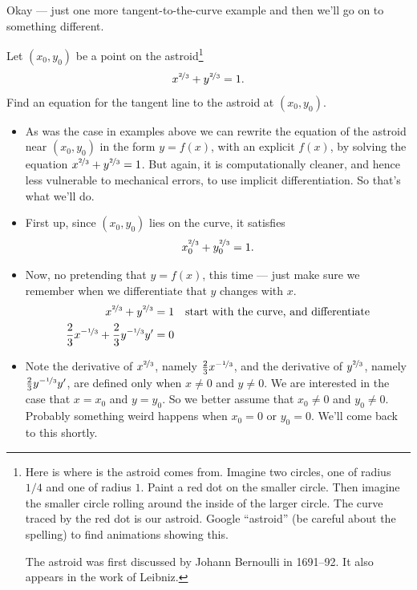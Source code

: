 Okay --- just one more tangent-to-the-curve example and then we'll go on to
something different.
\begin{eg}\label{eg:DIFFimpldiffB}
Let $(x_0,y_0)$ be a point on the astroid\footnote{Here is where is the
astroid comes from. Imagine two circles, one of radius $1/4$ and
one of radius $1$. Paint a red dot on the smaller circle. Then imagine
the smaller circle rolling around the inside of the larger circle. The
curve traced by the red dot is our astroid. Google ``astroid'' (be careful
about the spelling) to find animations showing this.

The astroid was first discussed by Johann Bernoulli in 1691--92. It also
appears in the work of Leibniz.}
\begin{align*}
x^{\nicefrac{2}{3}}+y^{\nicefrac{2}{3}}=1.
\end{align*}
Find an equation for the tangent line to the astroid at $(x_0,y_0)$.

\begin{itemize}
 \item As was the case in examples above we can rewrite the equation of
the astroid near $(x_0,y_0)$ in the form $y=f(x)$, with an explicit $f(x)$, by
solving the equation $x^{\nicefrac{2}{3}}+y^{\nicefrac{2}{3}}=1$. But again, it
is computationally cleaner, and hence less vulnerable to mechanical errors, to
use implicit differentiation. So that's what we'll do.

\item First up, since $(x_0,y_0)$ lies on the curve, it satisfies
\begin{align*}
x_0^{\nicefrac{2}{3}}+y_0^{\nicefrac{2}{3}}=1.
\end{align*}

\item Now, no pretending that $y=f(x)$, this time --- just make sure we
remember when we differentiate that $y$ changes with $x$.
\begin{align*}
  x^{\nicefrac{2}{3}}+y^{\nicefrac{2}{3}} &=1 &\text{start with the curve, and
differentiate}\\
\frac{2}{3}x^{-\nicefrac{1}{3}} + \frac{2}{3} y^{-\nicefrac{1}{3}} y' &=0
\end{align*}

\item Note the derivative of $x^{\nicefrac{2}{3}}$, namely
$\frac{2}{3}x^{-\nicefrac{1}{3}}$, and the derivative of
$y^{\nicefrac{2}{3}}$, namely $\frac{2}{3} y^{-\nicefrac{1}{3}}y'$,
are defined only when $x\ne 0$ and $y\ne 0$. We are interested in the case that
$x=x_0$ and $y=y_0$. So we better assume that $x_0\ne 0$ and $y_0\ne 0$.
Probably something weird happens when $x_0=0$ or $y_0=0$. We'll come back to
this shortly.


\end{itemize}
\end{eg}

